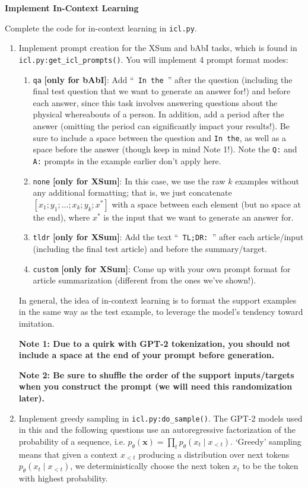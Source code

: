 \item {} {\bf Implement In-Context Learning}

Complete the code for in-context learning in \texttt{icl.py}.
\begin{enumerate}[label=(\roman*)]
    \item Implement prompt creation for the XSum and bAbI tasks, which is found in \texttt{icl.py:get\_icl\_prompts()}. You will implement 4 prompt format modes:
    \begin{enumerate}[label={\arabic*}]
        \item \texttt{qa} \textbf{[only for bAbI]}: Add ``\texttt{ In the }'' after the question (including the final test question that we want to generate an answer for!) and before each answer, since this task involves answering questions about the physical whereabouts of a person. In addition, add a period after the answer (omitting the period can significantly impact your results!). Be sure to include a space between the question and \texttt{In the}, as well as a space before the answer (though keep in mind Note 1!). Note the  \texttt{Q:} and \texttt{A:} prompts in the example earlier don't apply here.
        \item \texttt{none} \textbf{[only for XSum]}: In this case, we use the raw $k$ examples without any additional formatting; that is, we just concatenate $[x_1; y_1; ... ; \allowbreak x_k; y_k; x^*]$ with a space between each element (but no space at the end), where $x^*$ is the input that we want to generate an answer for.
        \item \texttt{tldr} \textbf{[only for XSum]}: Add the text ``\texttt{ TL;DR: }'' after each article/input (including the final test article) and before the summary/target.
        \item \texttt{custom} \textbf{[only for XSum]}: Come up with your own prompt format for article summarization (different from the ones we've shown!).
    \end{enumerate}
    In general, the idea of in-context learning is to format the support examples in the same way as the test example, to leverage the model's tendency toward imitation.

    \textbf{Note 1: Due to a quirk with GPT-2 tokenization, you should not include a space at the end of your prompt before generation.}
    
    \textbf{Note 2: Be sure to shuffle the order of the support inputs/targets when you construct the prompt (we will need this randomization later).}
    \item Implement greedy sampling in \texttt{icl.py:do\_sample()}. The GPT-2 models used in this and the following questions use an autoregressive factorization of the probability of a sequence, i.e. $p_\theta(\mathbf{x}) = \prod_t p_\theta(x_t \mid x_{<t})$. `Greedy' sampling means that given a context $x_{<t}$ producing a distribution over next tokens $p_\theta(x_t \mid x_{<t})$, we deterministically choose the next token $x_t$ to be the token with highest probability.
    

\end{enumerate}

